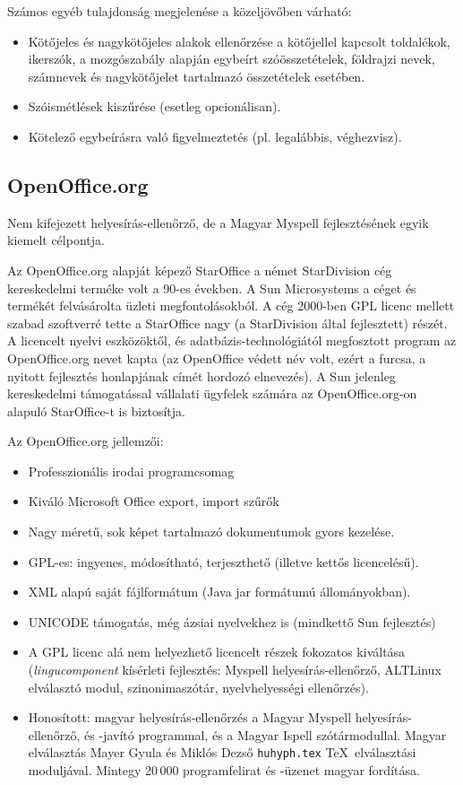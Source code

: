 Számos egyéb tulajdonság megjelenése a közeljövőben
várható:

\begin{itemize}

\item Kötőjeles és nagykötőjeles alakok ellenőrzése
a kötőjellel kapcsolt toldalékok, ikerszók, a
mozgószabály alapján egybeírt szóösszetételek,
földrajzi nevek, számnevek és nagykötőjelet tartalmazó
összetételek esetében.

\item Szóismétlések kiszűrése (esetleg opcionálisan).

\item Kötelező egybeírásra való figyelmeztetés (pl.
legalábbis, véghezvisz).
\end{itemize}

\subsection{OpenOffice.org}

Nem kifejezett helyesírás-ellenőrző, de a Magyar Myspell
fejlesztésének egyik kiemelt célpontja.

Az OpenOffice.org alapját képező StarOffice
a német StarDivision cég kereskedelmi terméke volt a
90-es években. A Sun Microsystems a céget és termékét felvásárolta
üzleti megfontolásokból. A cég 2000-ben GPL licenc mellett 
szabad szoftverré tette a StarOffice
nagy (a StarDivision által fejlesztett) részét.
A licencelt nyelvi eszközöktől, és adatbázis-technológiától megfosztott
program az OpenOffice.org nevet kapta (az OpenOffice védett név volt,
ezért a furcsa, a nyitott fejlesztés honlapjának címét hordozó
elnevezés). A Sun jelenleg kereskedelmi támogatással vállalati
ügyfelek számára az OpenOffice.org-on alapuló StarOffice-t
is biztosítja.

Az OpenOffice.org jellemzői:

\begin{itemize}
\item Professzionális irodai programcsomag
\item Kiváló Microsoft Office export, import szűrők
\item Nagy méretű, sok képet tartalmazó dokumentumok gyors kezelése.
\item GPL-es: ingyenes, módosítható, terjeszthető (illetve kettős licencelésű).
\item XML alapú saját fájlformátum (Java jar formátumú állományokban).
\item UNICODE támogatás, még ázsiai nyelvekhez is (mindkettő Sun fejlesztés)
\item A GPL licenc alá nem helyezhető licencelt részek fokozatos kiváltása
(\emph{lingucomponent} kísérleti fejlesztés: Myspell helyesírás-ellenőrző,
ALTLinux elválasztó modul, szinonimaszótár, nyelvhelyességi ellenőrzés).
\item Honosított: magyar helyesírás-ellenőrzés a Magyar Myspell
helyesírás-ellenőrző, és -javító programmal, és a Magyar Ispell
szótármodullal. Magyar elválasztás Mayer Gyula és Miklós Dezső
\texttt{huhyph.tex} \TeX\ elválasztási moduljával. Mintegy 20\,000 programfelirat
és -üzenet magyar fordítása.
\end{itemize}

